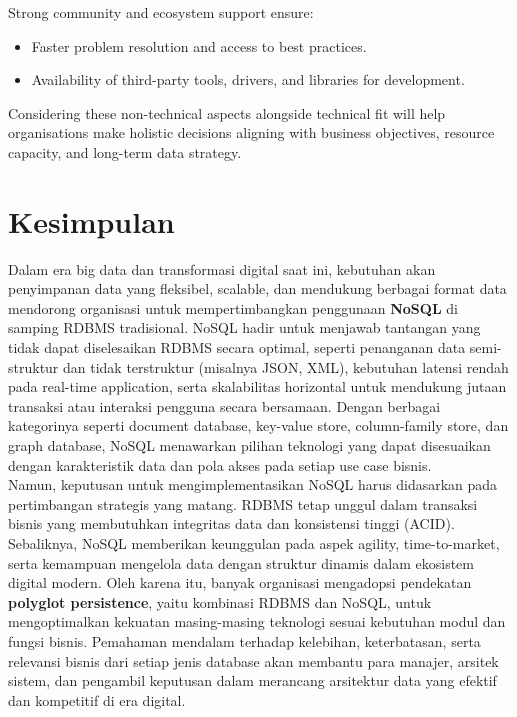 Strong community and ecosystem support ensure:
\begin{itemize}
	\item Faster problem resolution and access to best practices.
	\item Availability of third-party tools, drivers, and libraries for development.
\end{itemize}

\vspace{10pt}
Considering these non-technical aspects alongside technical fit will help organisations make holistic decisions aligning with business objectives, resource capacity, and long-term data strategy.


\section{Kesimpulan}

Dalam era big data dan transformasi digital saat ini, kebutuhan akan penyimpanan data yang fleksibel, scalable, dan mendukung berbagai format data mendorong organisasi untuk mempertimbangkan penggunaan \textbf{NoSQL} di samping RDBMS tradisional. NoSQL hadir untuk menjawab tantangan yang tidak dapat diselesaikan RDBMS secara optimal, seperti penanganan data semi-struktur dan tidak terstruktur (misalnya JSON, XML), kebutuhan latensi rendah pada real-time application, serta skalabilitas horizontal untuk mendukung jutaan transaksi atau interaksi pengguna secara bersamaan. Dengan berbagai kategorinya seperti document database, key-value store, column-family store, dan graph database, NoSQL menawarkan pilihan teknologi yang dapat disesuaikan dengan karakteristik data dan pola akses pada setiap use case bisnis.\\

Namun, keputusan untuk mengimplementasikan NoSQL harus didasarkan pada pertimbangan strategis yang matang. RDBMS tetap unggul dalam transaksi bisnis yang membutuhkan integritas data dan konsistensi tinggi (ACID). Sebaliknya, NoSQL memberikan keunggulan pada aspek agility, time-to-market, serta kemampuan mengelola data dengan struktur dinamis dalam ekosistem digital modern. Oleh karena itu, banyak organisasi mengadopsi pendekatan \textbf{polyglot persistence}, yaitu kombinasi RDBMS dan NoSQL, untuk mengoptimalkan kekuatan masing-masing teknologi sesuai kebutuhan modul dan fungsi bisnis. Pemahaman mendalam terhadap kelebihan, keterbatasan, serta relevansi bisnis dari setiap jenis database akan membantu para manajer, arsitek sistem, dan pengambil keputusan dalam merancang arsitektur data yang efektif dan kompetitif di era digital.